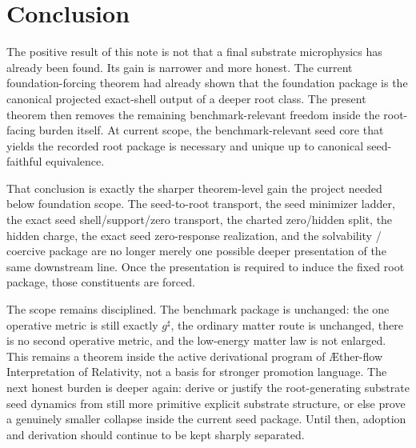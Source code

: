 \documentclass[11pt]{article}
\newcommand{\Aflow}{\AE{}ther-flow}
\newcommand{\TheoryName}{\Aflow{} Interpretation of Relativity}
\newcommand{\CompletedMetric}{g^{\sharp}}
\begin{document}
\section{Conclusion}

The positive result of this note is not that a final substrate microphysics has already been found. Its gain is narrower and more honest. The current foundation-forcing theorem had already shown that the foundation package is the canonical projected exact-shell output of a deeper root class. The present theorem then removes the remaining benchmark-relevant freedom inside the root-facing burden itself. At current scope, the benchmark-relevant seed core that yields the recorded root package is necessary and unique up to canonical seed-faithful equivalence.

That conclusion is exactly the sharper theorem-level gain the project needed below foundation scope. The seed-to-root transport, the seed minimizer ladder, the exact seed shell/support/zero transport, the charted zero/hidden split, the hidden charge, the exact seed zero-response realization, and the solvability / coercive package are no longer merely one possible deeper presentation of the same downstream line. Once the presentation is required to induce the fixed root package, those constituents are forced.

The scope remains disciplined. The benchmark package is unchanged: the one operative metric is still exactly \(\CompletedMetric\), the ordinary matter route is unchanged, there is no second operative metric, and the low-energy matter law is not enlarged. This remains a theorem inside the active derivational program of \TheoryName{}, not a basis for stronger promotion language. The next honest burden is deeper again: derive or justify the root-generating substrate seed dynamics from still more primitive explicit substrate structure, or else prove a genuinely smaller collapse inside the current seed package. Until then, adoption and derivation should continue to be kept sharply separated.
\end{document}
